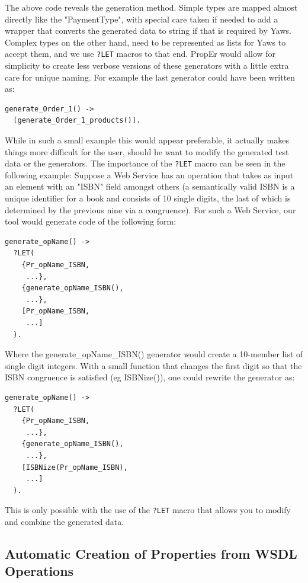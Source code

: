 \documentclass[submission,copyright,a4]{eptcs}
\newcommand{\LET}{\texttt{?LET}\xspace}
\begin{document}
The above code reveals the generation method. Simple types are mapped almost directly like the "PaymentType", with special care taken if needed to add a wrapper that converts the generated data to string if that is required by Yaws. Complex types on the other hand, need to be represented as lists for Yaws to accept them, and we use \LET macros to that end. 
PropEr would allow for simplicity to create less verbose versions of these generators with a little extra care for unique naming. For example the last generator could have been written as:

\begin{lstlisting}
generate_Order_1() ->
  [generate_Order_1_products()].
\end{lstlisting}

While in such a small example this would appear preferable, it actually makes things more difficult for the user, should he want to modify the generated test data or the generators. The importance of the \LET macro can be seen in the following example: Suppose a Web Service has an operation that takes as input an element with an "ISBN" field amongst others (a semantically valid ISBN is a unique identifier for a book and consists of 10 single digits, the last of which is determined by the previous nine via a congruence). For such a Web Service, our tool would generate code of the following form:

\begin{lstlisting}
generate_opName() ->
  ?LET(
    {Pr_opName_ISBN,
     ...},
    {generate_opName_ISBN(),
     ...},
    [Pr_opName_ISBN,
     ...]
  ).
\end{lstlisting}

Where the generate\_opName\_ISBN() generator would create a 10-member list of single digit integers. With a small function that changes the first digit so that the ISBN congruence is satisfied (eg ISBNize()), one could rewrite the generator as:

\begin{lstlisting}
generate_opName() ->
  ?LET(
    {Pr_opName_ISBN,
     ...},
    {generate_opName_ISBN(),
     ...},
    [ISBNize(Pr_opName_ISBN),
     ...]
  ).
\end{lstlisting}

This is only possible with the use of the \LET macro that allows you to modify and combine the generated data. 


\subsection{Automatic Creation of Properties from WSDL Operations}
\end{document}
